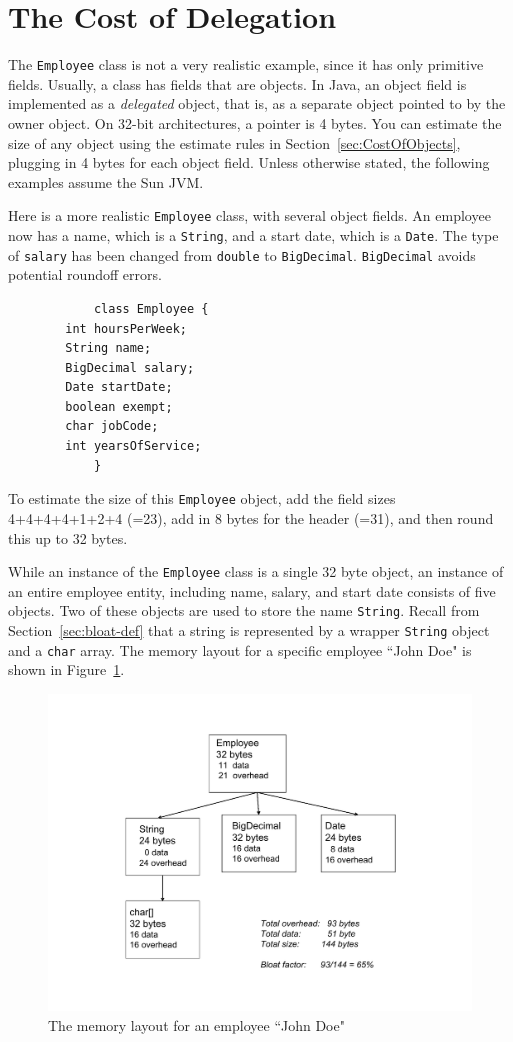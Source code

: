 \section{The Cost of Delegation}

The \texttt{Employee} class is not a very realistic example, since it has only primitive fields. Usually, a class has fields that are objects.  In Java, an object field is implemented as a \textit{delegated} object, that is, as a separate object pointed to by the owner object. On 32-bit architectures, a pointer is 4 bytes. You can estimate the size of any object using the estimate rules in Section~\ref{sec:CostOfObjects}, plugging in 4 bytes for each object field. Unless otherwise stated, the following examples assume the Sun JVM. 
\begin{example}
Here is a more realistic \texttt{Employee} class, with several object fields. An employee now has a name, which is a \texttt{String}, and a start date, which is a \texttt{Date}. The type of \texttt{salary} has been changed from \texttt{double} to \texttt{BigDecimal}. \texttt{BigDecimal} avoids potential roundoff errors.
\ttfamily
\begin{verbatim} 
			class Employee {
        int hoursPerWeek;
        String name;
        BigDecimal salary;
        Date startDate;
        boolean exempt;
        char jobCode;
        int yearsOfService;
			}
\end{verbatim}
\normalfont
To estimate the size of this \texttt{Employee} object, add the field sizes 4+4+4+4+1+2+4 (=23), add in 8 bytes for the header (=31), and then round this up to 32 bytes. 
\end{example}

While an instance of the \texttt{Employee} class is a single 32 byte object, an instance of an entire employee entity, including name, salary, and start date consists of five objects. Two of these objects are used to store the name \texttt{String}. Recall from Section~\ref{sec:bloat-def} that a string is represented by a wrapper \texttt{String} object and a \texttt{char} array. The memory layout for a specific employee ``John Doe" is shown in Figure~\ref{fig:employee-status}. 
 \begin{figure}
  \centering
 \includegraphics[width=.60\textwidth]{Figures/chapter4/employee-status.pdf}
  \caption{The memory layout for an employee ``John Doe"}
  \label{fig:employee-status}
\end{figure}


